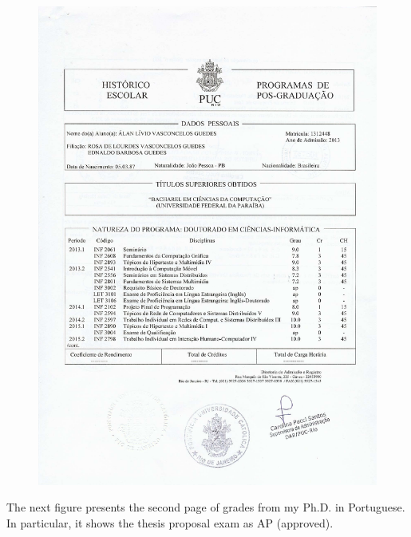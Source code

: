 \documentclass[10pt,a4paper,sans,colorlinks]{moderncv}
\begin{document}
\begin{figure}
    \centering
    \includegraphics[align=t,width=\textwidth,height=0.6\paperheight, keepaspectratio=true]{certificates/phd-grades.pdf}
\end{figure}

\newpage
The next figure presents the second page of grades from my Ph.D. in Portuguese. In particular, it shows the thesis proposal exam as AP (approved).
\end{document}
